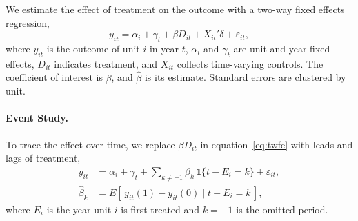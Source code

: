 We estimate the effect of treatment on the outcome with a two-way fixed effects
regression,
\begin{equation} \label{eq:twfe}
  y_{it} = \alpha_i + \gamma_t + \beta D_{it} + X_{it}'\delta + \varepsilon_{it},
\end{equation}
where $y_{it}$ is the outcome of unit $i$ in year $t$, $\alpha_i$ and $\gamma_t$ are unit
and year fixed effects, $D_{it}$ indicates treatment, and $X_{it}$ collects time-varying
controls. The coefficient of interest is $\beta$, and $\hat\beta$ is its estimate.
Standard errors are clustered by unit.

\paragraph{Event Study.} To trace the effect over time, we replace $\beta D_{it}$ in
equation~\eqref{eq:twfe} with leads and lags of treatment,
\begin{align}
  y_{it} &= \alpha_i + \gamma_t + \sum_{k \neq -1} \beta_k \, \mathds{1}\{t - E_i = k\}
            + \varepsilon_{it}, \label{eq:es} \\
  \hat\beta_k &= E[\,y_{it}(1) - y_{it}(0) \mid t - E_i = k\,], \nonumber
\end{align}
where $E_i$ is the year unit $i$ is first treated and $k = -1$ is the omitted period.
